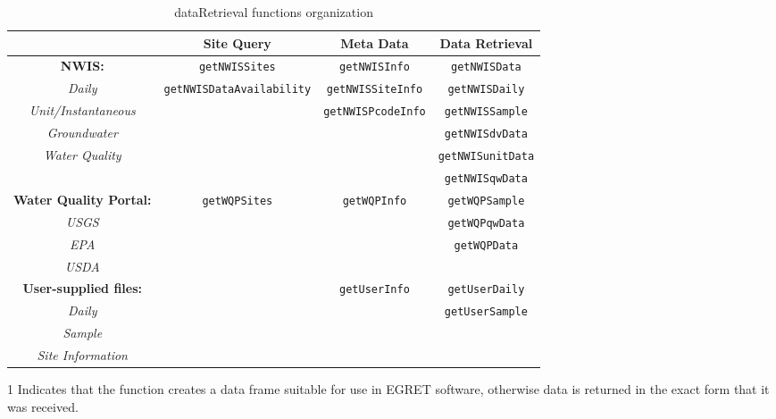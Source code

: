 \documentclass[a4paper,11pt]{article}\usepackage[]{graphicx}\usepackage[]{color}
\begin{document}
\begin{table}[!ht]
\begin{minipage}{\linewidth}
{\footnotesize
\begin{threeparttable}[b]
\caption{dataRetrieval functions organization} 
\label{tab:dataRetrievalOrg}
\begin{tabular}{|c|ccc|}

\multicolumn{1}{c}{\textbf{\textsf{}}} &
\multicolumn{1}{c}{\textbf{\textsf{Site Query}}} &
\multicolumn{1}{c}{\textbf{\textsf{Meta Data}}} &
\multicolumn{1}{c}{\textbf{\textsf{Data Retrieval}}} \\  [0pt]
\hline
\textbf{NWIS:} & \texttt{getNWISSites} & \texttt{getNWISInfo}\tnote{1} & \texttt{getNWISData}  \\
\textit{Daily} & \texttt{getNWISDataAvailability}& \texttt{getNWISSiteInfo} & \texttt{getNWISDaily}\tnote{1} \\
\textit{Unit/Instantaneous} &  & \texttt{getNWISPcodeInfo} & \texttt{getNWISSample}\tnote{1} \\
\textit{Groundwater} & &  & \texttt{getNWISdvData}   \\
\textit{Water Quality} & & & \texttt{getNWISunitData}\\
 & & & \texttt{getNWISqwData} \\
\hline
\textbf{Water Quality Portal:} & \texttt{getWQPSites} & \texttt{getWQPInfo}\tnote{1} &  \texttt{getWQPSample}\tnote{1}\\
\textit{USGS} & & & \texttt{getWQPqwData} \\
\textit{EPA} & & & \texttt{getWQPData} \\
\textit{USDA} & & &  \\
\hline
\textbf{User-supplied files:} & & \texttt{getUserInfo}\tnote{1}  & \texttt{getUserDaily}\tnote{1}  \\
\textit{Daily} & & & \texttt{getUserSample}\tnote{1}  \\
\textit{Sample} & & &  \\
\textit{Site Information} & & & \\

   \hline
\end{tabular}
  \begin{tablenotes}
    \item[1] Indicates that the function creates a data frame suitable for use in EGRET software, otherwise data is returned in the exact form that it was received.
  \end{tablenotes}
 \end{threeparttable}
}
\end{minipage}
\end{table}
\end{document}
